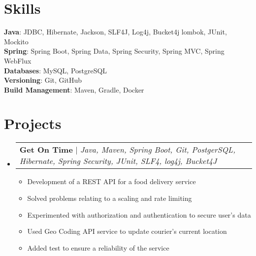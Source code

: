 \documentclass[letterpaper,11pt]{article}
\makeatletter
\newcommand{\resumeItem}[1]{
  \item\small{
    {#1 \vspace{-2pt}}
  }
}
\newcommand{\resumeProjectHeading}[2]{
    \item
    \begin{tabular*}{0.97\textwidth}{l@{\extracolsep{\fill}}r}
      \small#1 & #2 \\
    \end{tabular*}\vspace{-7pt}
}
\newcommand{\resumeSubHeadingListStart}{\begin{itemize}[leftmargin=0.15in, label={}]}
\newcommand{\resumeSubHeadingListEnd}{\end{itemize}}
\newcommand{\resumeItemListStart}{\begin{itemize}}
\newcommand{\resumeItemListEnd}{\end{itemize}\vspace{-5pt}}
\makeatother
\begin{document}
\section{Skills}
 \begin{itemize}[leftmargin=0.15in, label={}]
    \small{\item{
    
     \textbf{Java}{: JDBC, Hibernate, Jackson, SLF4J, Log4j, Bucket4j
     lombok, JUnit, Mockito} \\
     
     \textbf{Spring}{: Spring Boot, Spring Data, Spring Security, Spring MVC, Spring WebFlux} \\

    \textbf{Databases}{: MySQL, PostgreSQL} \\
    \textbf{Versioning}{: Git, GitHub} \\
    \textbf{Build Management}{: Maven, Gradle, Docker} \\
     
     
    }}
 \end{itemize}

\section{Projects}
    \resumeSubHeadingListStart
        
      \resumeProjectHeading
        {\textbf{Get On Time} $|$ \footnotesize\emph{Java, Maven, Spring Boot, Git, PostgerSQL, Hibernate, Spring Security, JUnit, SLF4, log4j, Bucket4J}} {}
        \resumeItemListStart
            \resumeItem{Development of a REST API for a food delivery service}
            \resumeItem{Solved problems relating to a scaling and rate limiting}
            \resumeItem{Experimented with authorization and authentication to secure user's data}
            \resumeItem{Used Geo Coding API service to update courier's current location}
            \resumeItem{Added test to ensure a reliability of the service}
        \resumeItemListEnd
          
    \resumeSubHeadingListEnd
\end{document}
